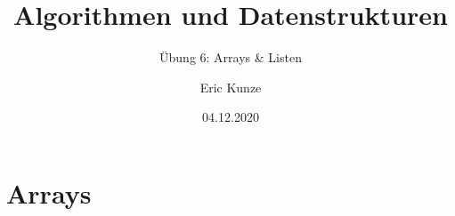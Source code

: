 \documentclass{beamer}
\begin{document}
	
	\title{Algorithmen und Datenstrukturen}
	\subtitle{Übung 6: Arrays \& Listen}
	\author{Eric Kunze}
	\date{04.12.2020}

	\maketitle



\section{Arrays}
\end{document}
